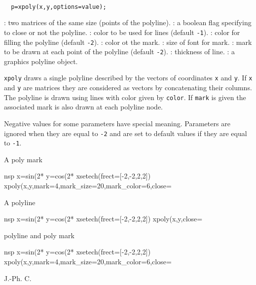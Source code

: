 \begin{mandesc}
  \\
\end{mandesc}
\begin{calling_sequence}
\begin{verbatim}
  p=xpoly(x,y,options=value);
\end{verbatim}
\end{calling_sequence}
\begin{parameters}
  \begin{varlist}
    : two matrices of the same size (points of the polyline).
    : a boolean flag specifying to close or not the polyline.
    : color to be used for lines (default \verb!-1!).
    : color for filling the polyline (default \verb!-2!).
    : color ot the mark.
    : size of font for mark.
    : mark to be drawn at each point of the polyline (default \verb!-2!).
    : thickness of line.
    : a graphics polyline object.
  \end{varlist}
\end{parameters}
\begin{mandescription}
  \verb!xpoly! draws a single polyline described by the vectors of
  coordinates \verb!x! and \verb!y!. If \verb!x! and
  \verb!y! are matrices they are considered as vectors by
  concatenating their columns. The polyline is drawn using
  lines with color given by \verb!color!. If \verb!mark! is
  given the associated mark is also drawn at each polyline node.

  Negative values for some parameters have special meaning.
  Parameters are ignored when they are equal to \verb!-2!
  and are set to default values if they are equal to \verb!-1!.
\end{mandescription}
\begin{examples}

\noindent A poly mark

  \begin{mintednsp}{nsp}
    x=sin(2*%
    y=cos(2*%
    xsetech(frect=[-2,-2,2,2])
    xpoly(x,y,mark=4,mark_size=20,mark_color=6,close=%
  \end{mintednsp}

\noindent A polyline

  \begin{mintednsp}{nsp}
    x=sin(2*%
    y=cos(2*%
    xsetech(frect=[-2,-2,2,2])
    xpoly(x,y,close=%
  \end{mintednsp}

\noindent polyline and poly mark

  \begin{mintednsp}{nsp}
    x=sin(2*%
    y=cos(2*%
    xsetech(frect=[-2,-2,2,2])
    xpoly(x,y,mark=4,mark_size=20,mark_color=6,close=%
  \end{mintednsp}

\end{examples}
\begin{manseealso}
    
\end{manseealso}
\begin{authors}
  J.-Ph. C.
\end{authors}
